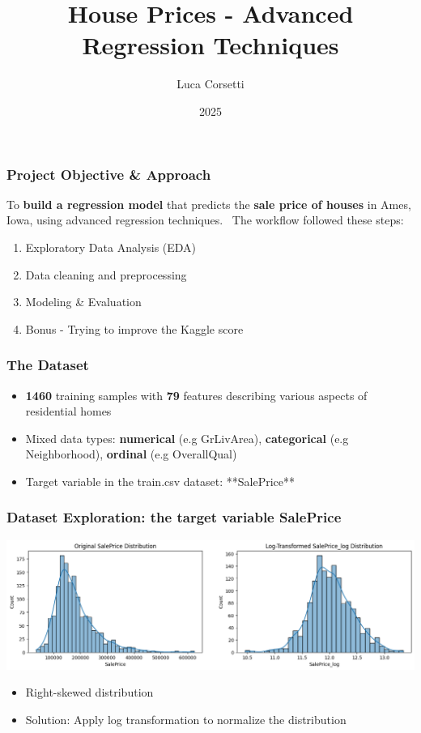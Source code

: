 \documentclass{beamer}
\title{House Prices - Advanced Regression Techniques}
\author{Luca Corsetti}
\institute{University of Bologna}
\date{2025}
\begin{document}
\frame{\titlepage}

\begin{frame}
\frametitle{Project Objective \& Approach}
To \textbf{build a regression model} that predicts the \textbf{sale price of houses} in Ames, Iowa, using advanced regression techniques.
\
The workflow followed these steps:

\begin{enumerate}
    \item Exploratory Data Analysis (EDA)
    \item Data cleaning and preprocessing
    \item Modeling \& Evaluation
    \item Bonus - Trying to improve the Kaggle score
\end{enumerate}
\end{frame}

\begin{frame}
\frametitle{The Dataset}
\begin{itemize}
    \item \textbf{1460} training samples with \textbf{79} features describing various aspects of residential homes
    \item Mixed data types: \textbf{numerical} (e.g GrLivArea), \textbf{categorical} (e.g Neighborhood), \textbf{ordinal} (e.g OverallQual)
    \item Target variable in the train.csv dataset: **SalePrice**
\end{itemize}
\end{frame}

\begin{frame}
\frametitle{Dataset Exploration: the target variable \textbf{SalePrice}}
\centering
    \includegraphics[width=1\textwidth]{../challenge/main_files/main_30_0.png}

\begin{itemize}
    \item Right-skewed distribution
    \item Solution: Apply log transformation to normalize the distribution
\end{itemize}
\end{frame}
\end{document}
